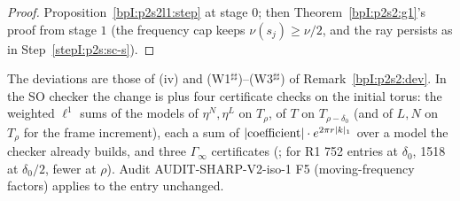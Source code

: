 \begin{proof}
\label{stepI:p2s2l1:g1}
Proposition~\ref{bpI:p2s2l1:step} at stage $0$; then Theorem~\ref{bpI:p2s2:g1}'s proof from stage $1$ (the frequency cap keeps $\nu(s_j)\ge\nu/2$, and the ray persists
as in Step~\ref{stepI:p2s:sc-s}).
\end{proof}

\begin{remark}\label{bpI:p2s2l1:dev}
The deviations are those of (iv) and (W1$^{\sharp\sharp}$)--(W3$^{\sharp\sharp}$) of Remark~\ref{bpI:p2s2:dev}. In the SO checker the change is
 plus four certificate checks on the initial torus: the weighted $\ell^1$ sums of the models of $\eta^N,\eta^L$ on $T_\rho$, of $T$ on
$T_{\rho-\delta_0}$ (and of $L,N$ on $T_\rho$ for the frame increment), each a sum of $\lvert \text{coefficient}\rvert\cdot e^{2\pi r\lvert k\rvert_1}$ over a model the checker
already builds, and three $\Gamma_\infty$ certificates (; for R1 752 entries at $\delta_0$, 1518 at $\delta_0/2$, fewer at $\rho$).
Audit AUDIT-SHARP-V2-iso-1 F5 (moving-frequency factors) applies to the entry unchanged.
\end{remark}
